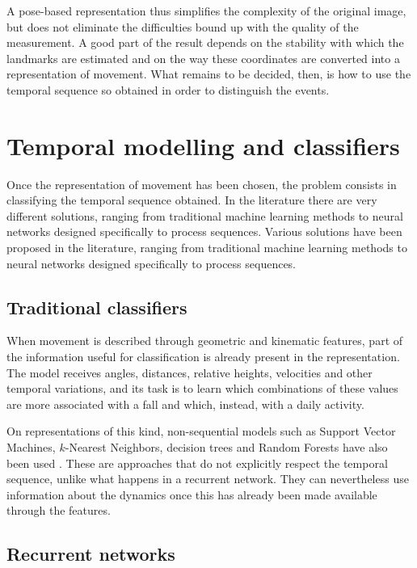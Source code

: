 A pose-based representation thus simplifies the complexity of the original image, but does not eliminate the difficulties bound up with the quality of the measurement. A good part of the result depends on the stability with which the landmarks are estimated and on the way these coordinates are converted into a representation of movement. What remains to be decided, then, is how to use the temporal sequence so obtained in order to distinguish the events.

\section{Temporal modelling and classifiers}

Once the representation of movement has been chosen, the problem consists in classifying the temporal sequence obtained. In the literature there are very different solutions, ranging from traditional machine learning methods to neural networks designed specifically to process sequences.
Various solutions have been proposed in the literature, ranging from traditional machine learning methods to neural networks designed specifically to process sequences.

\subsection{Traditional classifiers}

When movement is described through geometric and kinematic features, part of the information useful for classification is already present in the representation. The model receives angles, distances, relative heights, velocities and other temporal variations, and its task is to learn which combinations of these values are more associated with a fall and which, instead, with a daily activity.

On representations of this kind, non-sequential models such as Support Vector Machines, $k$-Nearest Neighbors, decision trees and Random Forests have also been used \cite{HO}. These are approaches that do not explicitly respect the temporal sequence, unlike what happens in a recurrent network. They can nevertheless use information about the dynamics once this has already been made available through the features.

\subsection{Recurrent networks}

